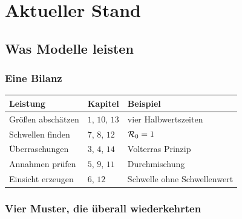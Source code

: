 \part{Aktueller Stand}

\chapter{Was Modelle leisten}

\section{Eine Bilanz}

\begin{merksatz}
\begin{center}
{\small
\renewcommand{\arraystretch}{1.5}
\begin{tabular}{@{}P{2.8cm}P{2.2cm}P{3.2cm}@{}}
\toprule
\textbf{Leistung} & \textbf{Kapitel} & \textbf{Beispiel}\\
\midrule
Größen abschätzen & $1$, $10$, $13$ & vier Halbwertszeiten\\
Schwellen finden & $7$, $8$, $12$ & $\mathcal{R}_0 = 1$\\
Überraschungen & $3$, $4$, $14$ & Volterras Prinzip\\
Annahmen prüfen & $5$, $9$, $11$ & Durchmischung\\
Einsicht erzeugen & $6$, $12$ & Schwelle ohne Schwellenwert\\
\bottomrule
\end{tabular}}
\end{center}

\begin{center}
\begin{minipage}{0.88\textwidth}
\end{minipage}
\end{center}
\end{merksatz}

\section{Vier Muster, die überall wiederkehrten}

